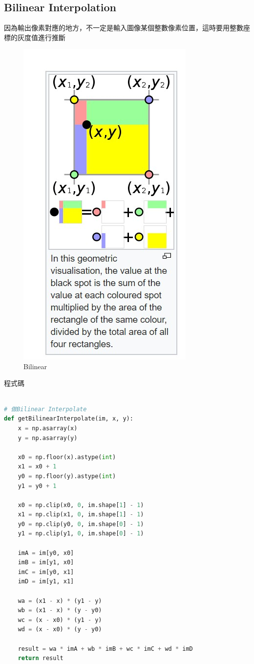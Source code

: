 \documentclass[12pt,a4paper]{article}
\begin{document}
\newpage %
\subsection{Bilinear Interpolation }
{
因為輸出像素對應的地方，不一定是輸入圖像某個整數像素位置，這時要用整數座標的灰度值進行推斷
\begin{figure}[ht]
\centering
\includegraphics[width=.4\textwidth]{image/bilinear.jpg}
\caption{Bilinear}%
\label{Bilinear}%
\end{figure}

程式碼
\begin{lstlisting}[language=Python]

# 做Bilinear Interpolate
def getBilinearInterpolate(im, x, y):
    x = np.asarray(x)
    y = np.asarray(y)

    x0 = np.floor(x).astype(int)
    x1 = x0 + 1
    y0 = np.floor(y).astype(int)
    y1 = y0 + 1

    x0 = np.clip(x0, 0, im.shape[1] - 1)
    x1 = np.clip(x1, 0, im.shape[1] - 1)
    y0 = np.clip(y0, 0, im.shape[0] - 1)
    y1 = np.clip(y1, 0, im.shape[0] - 1)

    imA = im[y0, x0]
    imB = im[y1, x0]
    imC = im[y0, x1]
    imD = im[y1, x1]

    wa = (x1 - x) * (y1 - y)
    wb = (x1 - x) * (y - y0)
    wc = (x - x0) * (y1 - y)
    wd = (x - x0) * (y - y0)

    result = wa * imA + wb * imB + wc * imC + wd * imD
    return result
\end{lstlisting}
}
\end{document}
